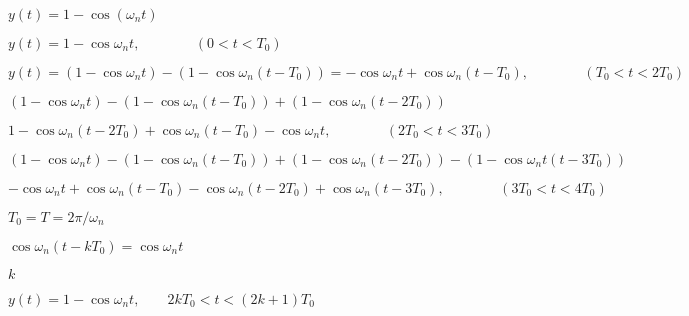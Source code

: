 \documentclass{article}
\def\lthtmlcheckvsize{\ifdim\ht\sizebox<\vsize 
  \ifdim\wd\sizebox<\hsize\expandafter\hfill\fi \expandafter\vfill
  \else\expandafter\vss\fi}%
\begin{document}
{\newpage\clearpage
{}%
$ y(t)=1-\cos(\omega_nt)$%
\lthtmlindisplaymathZ
\lthtmlcheckvsize\clearpage}

{\newpage\clearpage
{}%
$\displaystyle y(t)=1-\cos\omega_nt,\;\;\;\;\;\;\;\;\;\;\;\;\;\;(0<t<T_0)$%
\lthtmlindisplaymathZ
\lthtmlcheckvsize\clearpage}

{\newpage\clearpage
{}%
$\displaystyle y(t)=(1-\cos\omega_nt)-(1-\cos\omega_n(t-T_0))
=-\cos\omega_nt+\cos\omega_n(t-T_0),\;\;\;\;\;\;\;\;\;\;\;\;\;\;(T_0<t<2T_0)$%
\lthtmlindisplaymathZ
\lthtmlcheckvsize\clearpage}

{\newpage\clearpage
{}%
$\displaystyle (1-\cos\omega_nt)-(1-\cos\omega_n(t-T_0))+(1-\cos\omega_n(t-2T_0))$%
\lthtmlindisplaymathZ
\lthtmlcheckvsize\clearpage}

{\newpage\clearpage
{}%
$\displaystyle 1-\cos\omega_n(t-2T_0)+\cos\omega_n(t-T_0)-\cos\omega_nt,
\;\;\;\;\;\;\;\;\;\;\;\;\;\;(2T_0<t<3T_0)$%
\lthtmlindisplaymathZ
\lthtmlcheckvsize\clearpage}

{\newpage\clearpage
{}%
$\displaystyle (1-\cos\omega_nt)-(1-\cos\omega_n(t-T_0))+(1-\cos\omega_n(t-2T_0))
-(1-\cos\omega_nt(t-3T_0))$%
\lthtmlindisplaymathZ
\lthtmlcheckvsize\clearpage}

{\newpage\clearpage
{}%
$\displaystyle -\cos\omega_nt+\cos\omega_n(t-T_0)-\cos\omega_n(t-2T_0)+\cos\omega_n(t-3T_0),
\;\;\;\;\;\;\;\;\;\;\;\;\;\;(3T_0<t<4T_0)$%
\lthtmlindisplaymathZ
\lthtmlcheckvsize\clearpage}

{\newpage\clearpage
{}%
$ T_0=T=2\pi/\omega_n$%
\lthtmlindisplaymathZ
\lthtmlcheckvsize\clearpage}

{\newpage\clearpage
{}%
$ \cos\omega_n(t-kT_0)=\cos\omega_nt$%
\lthtmlindisplaymathZ
\lthtmlcheckvsize\clearpage}

{\newpage\clearpage
{}%
$ k$%
\lthtmlindisplaymathZ
\lthtmlcheckvsize\clearpage}

{\newpage\clearpage
{}%
$\displaystyle y(t)=1-\cos\omega_nt,\;\;\;\;\;\;\;2kT_0<t<(2k+1)T_0$%
\lthtmlindisplaymathZ
\lthtmlcheckvsize\clearpage}
\end{document}
